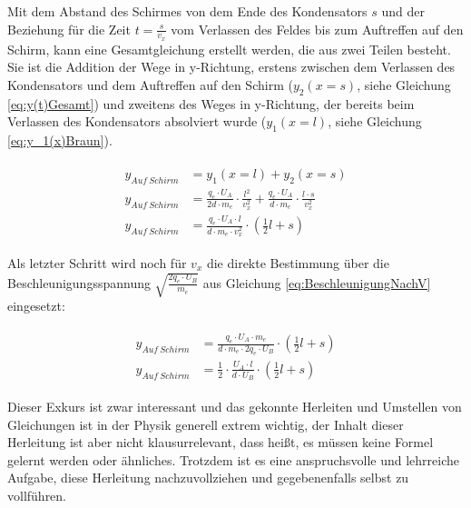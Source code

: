 \noindent Mit dem Abstand des Schirmes von dem Ende des Kondensators $s$ und der Beziehung für die Zeit $t=\frac{s}{v_x}$ vom Verlassen des Feldes bis zum Auftreffen auf den Schirm, kann eine Gesamtgleichung erstellt werden, die aus zwei Teilen besteht. Sie ist die Addition der Wege in y-Richtung, erstens zwischen dem Verlassen des Kondensators und dem Auftreffen auf den Schirm ($y_2(x=s)$, siehe Gleichung \ref{eq:y(t)Gesamt}) und zweitens des Weges in y-Richtung, der bereits beim Verlassen des Kondensators absolviert wurde ($y_1(x=l)$, siehe Gleichung \ref{eq:y_1(x)Braun}).

\begin{align} \label{eq:yGesamtAnsatz}
\begin{split}
	y_{Auf \ Schirm} &= y_1(x=l) + y_2(x=s) \\
	y_{Auf \ Schirm} &= \frac{q_e \cdot U_A}{2d \cdot m_e} \cdot \frac{l^2}{v_{x}^2}
				      + \frac{q_e \cdot U_A}{d \cdot m_e} \cdot \frac{l \cdot s}{v_{x}^2} \\
	y_{Auf \ Schirm} &= \frac{q_e \cdot U_A \cdot l}{d \cdot m_e \cdot v_{x}^2} \cdot (\frac{1}{2}l + s)
\end{split}
\end{align}

Als letzter Schritt wird noch für $v_{x}$ die direkte Bestimmung über die Beschleunigungsspannung $\sqrt{\frac{2 q_e \cdot U_B}{m_e}}$ aus Gleichung \ref{eq:BeschleunigungNachV} eingesetzt:

\begin{align} \label{eq:yGesamt}
\begin{split}
	y_{Auf \ Schirm} &= \frac{q_e \cdot U_A \cdot m_e}{d \cdot m_e \cdot 2 q_e \cdot U_B} \cdot (\frac{1}{2}l + s) \\
	y_{Auf \ Schirm} &= \frac{1}{2} \cdot \frac{U_A \cdot l}{d \cdot U_B} \cdot (\frac{1}{2}l + s)
\end{split}
\end{align}

\begin{Anmerkung}
Dieser Exkurs ist zwar interessant und das gekonnte Herleiten und Umstellen von Gleichungen ist in der Physik generell extrem wichtig, der Inhalt dieser Herleitung ist aber nicht klausurrelevant, dass heißt, es müssen keine Formel gelernt werden oder ähnliches. Trotzdem ist es eine anspruchsvolle und lehrreiche Aufgabe, diese Herleitung nachzuvollziehen und gegebenenfalls selbst zu vollführen.
\end{Anmerkung}




